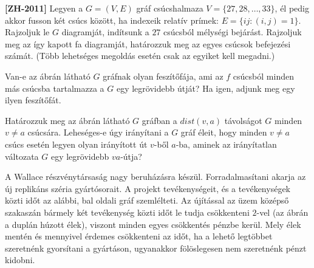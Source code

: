 \documentclass[a4paper,12pt]{article}
\begin{document}
\begin{enumerate}
        \item \label{feladat:zh2011} \textbf{[ZH-2011]} Legyen a $G=(V, E)$ gráf csúcshalmaza $V = \{27,28,\ldots,33\}$, él pedig akkor fusson két csúcs között, ha indexeik relatív prímek: $E = \{ij:(i,j) = 1\}$. Rajzoljuk le $G$ diagramját, indítsunk a $27$ csúcsból mélységi bejárást. Rajzoljuk meg az így kapott fa diagramját, határozzuk meg az egyes csúcsok befejezési számát. (Több lehetséges megoldás esetén csak az egyiket kell megadni.)
        
        \begin{minipage}{0.3\textwidth}
            \centering
            
        \end{minipage}
        \hfill
        \begin{minipage}{0.6\textwidth}    
            \item Van-e az ábrán látható $G$ gráfnak olyan feszítőfája, ami az $f$ csúcsból minden más csúcsba tartalmazza a $G$ egy legrövidebb útját? Ha igen, adjunk meg egy ilyen feszítőfát.
            \item Határozzuk meg az ábrán látható $G$ gráfban a $dist(v, a)$ távolságot $G$ minden $v\neq a$ csúcsára. Leheséges-e úgy irányítani a $G$ gráf éleit, hogy minden $v\neq a$ csúcs esetén legyen olyan irányított út $v$-ből $a$-ba, aminek az irányítatlan változata $G$ egy legrövidebb $va$-útja?
        \end{minipage}
        
        \begin{minipage}{0.63\textwidth}
            \item A Wallace részvénytársaság nagy beruházásra készül. Forradalmasítani akarja az új replikáns széria gyártósorait. A projekt tevékenységeit, és a tevékenységek közti időt az alábbi, bal oldali gráf szemlélteti. Az újítással az üzem középső szakaszán bármely két tevékenység közti időt le tudja csökkenteni $2$-vel (az ábrán a duplán húzott élek), viszont minden egyes csökkentés pénzbe kerül. Mely élek mentén és mennyivel érdemes csökkenteni az időt, ha a lehető legtöbbet szeretnénk gyorsítani a gyártáson, ugyanakkor fölöslegesen nem szeretnénk pénzt kidobni.
        \end{minipage}\hfill
        \begin{minipage}{0.3\textwidth}
            \centering
            
        \end{minipage}
    \end{enumerate}
\end{document}
